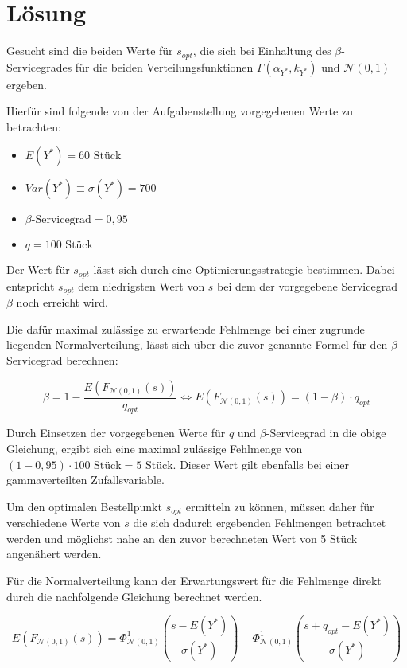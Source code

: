 \section{Lösung}

Gesucht sind die beiden Werte für \(s_{opt}\), die sich bei Einhaltung des \(\beta\)-Servicegrades für die beiden Verteilungsfunktionen \(\Gamma(\alpha_{Y^*},k_{Y^*})\) und \(\mathcal{N}(0,1)\) ergeben.

Hierfür sind folgende von der Aufgabenstellung vorgegebenen Werte zu betrachten:
\begin{itemize}
	\item \(E(Y^*)=60\text{ Stück}\)
	\item \(Var(Y^*)\equiv\sigma(Y^*)=700\)
	\item \(\beta\text{-Servicegrad}=0,95\)
	\item \(q=100\text{ Stück}\) 
\end{itemize}

Der Wert für \(s_{opt}\) lässt sich durch eine Optimierungsstrategie bestimmen. Dabei entspricht \(s_{opt}\) dem niedrigsten Wert von \(s\) bei dem der vorgegebene Servicegrad \(\beta\) noch erreicht wird. 

Die dafür maximal zulässige  zu erwartende Fehlmenge bei einer zugrunde liegenden Normalverteilung, lässt sich über die zuvor genannte Formel für den \(\beta\)-Servicegrad berechnen:

\[\beta = 1-\frac{E\left(F_{\mathcal{N}(0,1)}(s)\right)}{q_{opt}} \Leftrightarrow E\left(F_{\mathcal{N}(0,1)}(s)\right)=(1-\beta)\cdot q_{opt}\]

Durch Einsetzen der vorgegebenen Werte für \(q\) und \(\beta\)-Servicegrad in die obige Gleichung, ergibt sich eine maximal zulässige Fehlmenge von \((1-0,95)\cdot 100 \text{ Stück}=5\text{ Stück}\). Dieser Wert gilt ebenfalls bei einer gammaverteilten Zufallsvariable.

Um den optimalen Bestellpunkt \(s_{opt}\) ermitteln zu können, müssen daher für verschiedene Werte von \(s\) die sich dadurch ergebenden Fehlmengen betrachtet werden und möglichst nahe an den zuvor berechneten Wert von 5 Stück angenähert werden.

Für die Normalverteilung kann der Erwartungswert für die Fehlmenge direkt durch die nachfolgende Gleichung berechnet werden. 

\[E\left(F_{\mathcal{N}(0,1)}(s)\right)=\Phi^1_{\mathcal{N}(0,1)}\left(\frac{s-E(Y^*)}{\sigma(Y^*)}\right)-\Phi^1_{\mathcal{N}(0,1)}\left(\frac{s+q_{opt}-E(Y^*)}{\sigma(Y^*)}\right)\]

